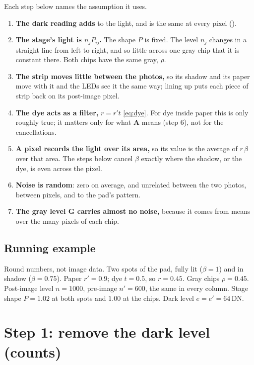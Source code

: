 \documentclass[11pt,letter]{article}
\newcommand{\file}[1]{\texttt{\seqsplit{#1}}}
\newcommand{\iG}{\mathbf{G}}   %
\newcommand{\iA}{\mathbf{A}}   %
\begin{document}
Each step below names the assumption it uses.
\begin{enumerate}[label=(A\arabic*), leftmargin=3.2em]
  \item \textbf{The dark reading adds} to the light, and is the same at
    every pixel (\file{dark\_signal\_characterization.tex}).
  \item \textbf{The stage's light is $n_j P_{ij}$.}  The shape $P$ is
    fixed.  The level $n_j$ changes in a straight line from left to right,
    and so little across one gray chip that it is constant there.  Both
    chips have the same gray, $\rho$.
  \item \textbf{The strip moves little between the photos,} so its shadow
    and its paper move with it and the LEDs see it the same way; lining up
    puts each piece of strip back on its post-image pixel.
  \item \textbf{The dye acts as a filter,} $r = r' t$
    \eqref{eq:dye}.  For dye inside paper this is only roughly true; it
    matters only for what $\iA$ means (step 6), not for the cancellations.
  \item \textbf{A pixel records the light over its area,} so its value is
    the average of $r\,\beta$ over that area.  The steps below cancel $\beta$
    exactly where the shadow, or the dye, is even across the pixel.
  \item \textbf{Noise is random}: zero on average, and unrelated between
    the two photos, between pixels, and to the pad's pattern.
  \item \textbf{The gray level $\iG$ carries almost no noise,} because it
    comes from means over the many pixels of each chip.
\end{enumerate}

\subsection*{Running example}

Round numbers, not image data.  Two spots of the pad, fully lit
($\beta = 1$) and in shadow ($\beta = 0.75$).  Paper $r' = 0.9$; dye $t = 0.5$, so
$r = 0.45$.  Gray chips $\rho = 0.45$.  Post-image level $n = 1000$,
pre-image $n' = 600$, the same in every column.  Stage shape $P = 1.02$ at
both spots and $1.00$ at the chips.  Dark level $e = e' = 64$\,DN.

\section{Step 1: remove the dark level (counts)}
\label{sec:dark}
\end{document}
